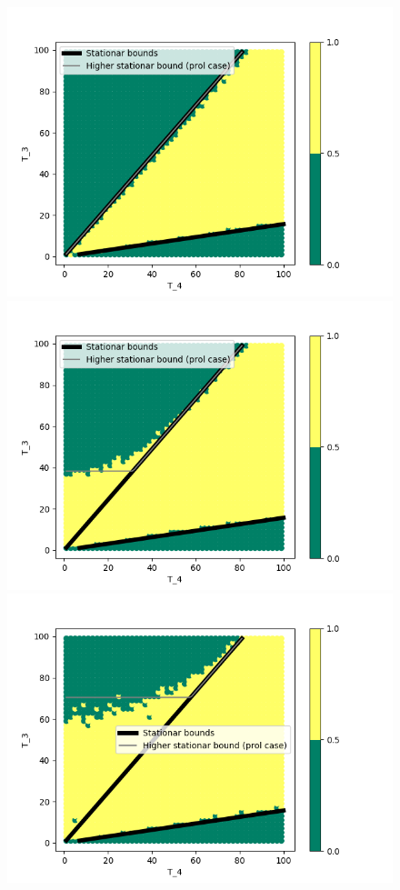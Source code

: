 \documentclass[a4paper,12pt,russian]{extarticle}
\begin{document}
\begin{figure}
\begin{multicols}{2}
    \includegraphics[width=1.15\linewidth]{0_1_thres_-1_fact.png}\par 
    \includegraphics[width=1.15\linewidth]{0_1_thres_5_fact.png}\par 
    \end{multicols}
\begin{multicols}{2}
    \includegraphics[width=1.15\linewidth]{0_1_thres_10_fact.png}\par

\end{multicols}
\end{figure}
\end{document}
